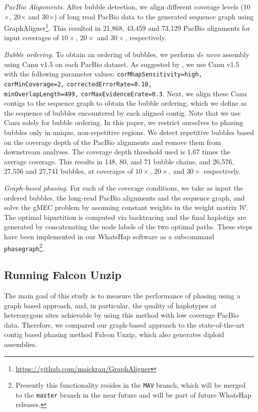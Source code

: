 \textit{PacBio Alignments}. After bubble detection, we align different coverage levels (10$\times$, 20$\times$ and 30$\times$) of long read PacBio data to the generated sequence graph using GraphAligner\footnote{\url{https://github.com/maickrau/GraphAligner}}.
This resulted in 21,868, 43,459 and 73,129 PacBio alignments for input coverages of $10\times$, $20\times$ and $30\times$, respectively.

\textit{Bubble ordering}. To obtain an ordering of bubbles, we perform \textit{de novo} assembly using Canu v1.5 \citep{koren2017canu} on each PacBio dataset.
As suggested by \cite{giordano2017novo}, we use Canu v1.5 with the following parameter values: \texttt{corMhapSensitivity=high,} \texttt{corMinCoverage=2,} \texttt{correctedErrorRate=0.10,}\\
\texttt{minOverlapLength=499,} \texttt{corMaxEvidenceErate=0.3}.
Next, we align these Canu contigs to the sequence graph to obtain the bubble ordering, which we define as the sequence of bubbles encountered by each aligned contig.
Note that we use Canu solely for bubble ordering.
In this paper, we restrict ourselves to phasing bubbles only in unique, non-repetitive regions.
We detect repetitive bubbles based on the coverage depth of the PacBio alignments and remove them from downstream analyses.
The coverage depth threshold used is 1.67 times the average coverage.
This results in 148, 80, and 71 bubble chains, and 26,576, 27,556 and 27,741 bubbles, at coverages of $10\times$, $20\times$, and $30\times$ respectively.


\textit{Graph-based phasing}. For each of the coverage conditions, we take as input the ordered bubbles, the long-read PacBio alignments and the sequence graph, and solve the gMEC problem by assuming constant weights in the weight matrix $\mathcal{W}$.
The optimal bipartition is computed via backtracing and the final haplotigs are generated by concatenating the node labels of the two optimal paths.
These steps have been implemented in our WhatsHap software as a subcommand \texttt{phasegraph}\footnote{Presently this functionality resides in the \texttt{MAV} branch, which will be merged to the \texttt{master} branch in the near future and will be part of future WhatsHap releases.}.
\subsection{Running Falcon Unzip}
The main goal of this study is to measure the performance of phasing using a graph based approach, 
and, in particular, the quality of haplotypes at heterozygous sites achievable by using this method with low coverage PacBio data.
Therefore, we compared our graph-based approach to the state-of-the-art contig based phasing method Falcon Unzip, which also generates diploid assemblies.


